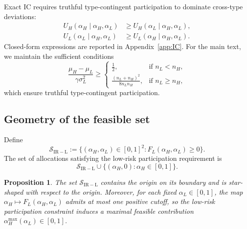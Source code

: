 \documentclass[a4paper,12pt]{article}
\newtheorem{proposition}[theorem]{Proposition}
\theoremstyle{definition}
\theoremstyle{remark}
\newcommand{\1}{\mathbf{1}}
\begin{document}
Exact IC requires truthful type-contingent participation to dominate cross-type deviations:
\begin{subequations}\label{eq:IC-ind-new}
\begin{align}
U_H(\alpha_H\mid \alpha_H,\alpha_L)
&\ge
U_H(\alpha_L\mid \alpha_H,\alpha_L),
\\
U_L(\alpha_L\mid \alpha_H,\alpha_L)
&\ge
U_L(\alpha_H\mid \alpha_H,\alpha_L).
\end{align}
\end{subequations}
Closed-form expressions are reported in Appendix~\ref{app:IC}. For the main text, we maintain the sufficient conditions
\begin{equation}\label{eq:IC-conditions-new}
    \frac{\mu_H - \mu_L}{\gamma \sigma_L^2} \ge 
    \begin{cases}
        \tfrac{1}{2}, & \text{if } n_L < n_H,\\[6pt]
        \displaystyle \frac{(n_L + n_H)^2}{8 n_L n_H},
        & \text{if } n_L \ge n_H,
    \end{cases}
\end{equation}
which ensure truthful type-contingent participation.

\subsection{Geometry of the feasible set}

Define
\[
\mathcal S_{\mathrm{IR-L}}
:=
\bigl\{(\alpha_H,\alpha_L)\in[0,1]^2: F_L(\alpha_H,\alpha_L)\ge 0\bigr\}.
\]
The set of allocations satisfying the low-risk participation requirement is
\[
\mathcal S_{\mathrm{IR-L}}
\cup
\bigl\{(\alpha_H,0):\alpha_H\in[0,1]\bigr\}.
\]

\begin{proposition}\label{prop:IRL-properties-new}
The set \(\mathcal S_{\mathrm{IR-L}}\) contains the origin on its boundary and is
star-shaped with respect to the origin. Moreover, for each fixed
\(\alpha_L\in[0,1]\), the map \(\alpha_H\mapsto F_L(\alpha_H,\alpha_L)\) admits
at most one positive cutoff, so the low-risk participation constraint induces a
maximal feasible contribution \(\alpha_H^{\max}(\alpha_L)\in[0,1]\).
\end{proposition}
\end{document}
